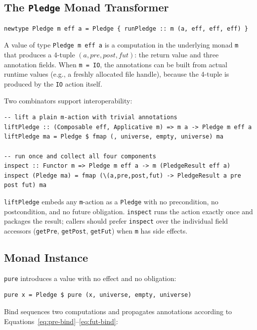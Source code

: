\documentclass[acmsmall,screen]{acmart}
\newcommand{\pre}{\mathit{pre}}
\newcommand{\post}{\mathit{post}}
\newcommand{\fut}{\mathit{fut}}
\begin{document}
\subsection{The \texttt{Pledge} Monad Transformer}
\label{sec:type}

\begin{lstlisting}
newtype Pledge m eff a = Pledge { runPledge :: m (a, eff, eff, eff) }
\end{lstlisting}

\noindent
A value of type \lstinline{Pledge m eff a} is a computation in the
underlying monad \lstinline{m} that produces a 4-tuple
$(a, \pre, \post, \fut)$: the return value and three annotation fields.
When \lstinline{m = IO}, the annotations can be built from actual runtime
values (e.g., a freshly allocated file handle), because the 4-tuple is
produced by the \lstinline{IO} action itself.

Two combinators support interoperability:

\begin{lstlisting}
-- lift a plain m-action with trivial annotations
liftPledge :: (Composable eff, Applicative m) => m a -> Pledge m eff a
liftPledge ma = Pledge $ fmap (, universe, empty, universe) ma

-- run once and collect all four components
inspect :: Functor m => Pledge m eff a -> m (PledgeResult eff a)
inspect (Pledge ma) = fmap (\(a,pre,post,fut) -> PledgeResult a pre post fut) ma
\end{lstlisting}

\noindent
\lstinline{liftPledge} embeds any \lstinline{m}-action as a \lstinline{Pledge}
with no precondition, no postcondition, and no future obligation.
\lstinline{inspect} runs the action exactly once and packages the result;
callers should prefer \lstinline{inspect} over the individual field accessors
(\lstinline{getPre}, \lstinline{getPost}, \lstinline{getFut}) when
\lstinline{m} has side effects.

\subsection{Monad Instance}

\lstinline{pure} introduces a value with no effect and no obligation:

\begin{lstlisting}
pure x = Pledge $ pure (x, universe, empty, universe)
\end{lstlisting}

\noindent
Bind sequences two computations and propagates annotations according to
Equations~\eqref{eq:pre-bind}--\eqref{eq:fut-bind}:
\end{document}
